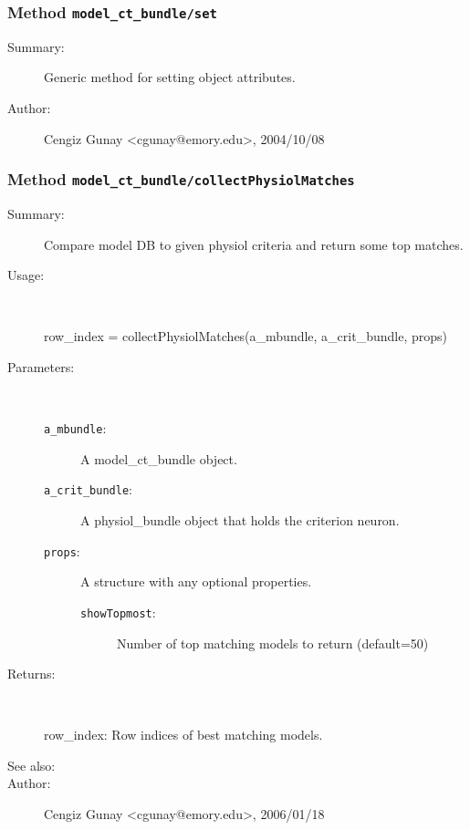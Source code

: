 \subsubsection[Method \texttt{set}]{Method \texttt{model\_ct\_bundle/set}}%
%
\label{ref_model_ct_bundle__set}%
\hypertarget{ref_model_ct_bundle__set}{}%
\begin{description}
\item[Summary:]Generic method for setting object attributes.
%
%
%
%
%
%
%
\item[Author:]%
Cengiz Gunay <cgunay@emory.edu>, 2004/10/08%
\end{description}
\methodline%
\subsubsection[Method \texttt{collectPhysiolMatches}]{Method \texttt{model\_ct\_bundle/collectPhysiolMatches}}%
%
\label{ref_model_ct_bundle__collectPhysiolMatches}%
\hypertarget{ref_model_ct_bundle__collectPhysiolMatches}{}%
\begin{description}
\item[Summary:]Compare model DB to given physiol criteria and return some top matches.
%
\item[Usage:]~%
\begin{lyxcode}%
row\_index = collectPhysiolMatches(a\_mbundle, a\_crit\_bundle, props)
%
\end{lyxcode}%
%
%
\item[Parameters:]~
\begin{description}%
\item[\texttt{a\_mbundle}:]
 A model\_ct\_bundle object.
\item[\texttt{a\_crit\_bundle}:]
 A physiol\_bundle object that holds the criterion neuron.
\item[\texttt{props}:]
 A structure with any optional properties.
\begin{description}%
\item[\texttt{showTopmost}:]
 Number of top matching models to return (default=50)
\end{description}%
\end{description}%
%
\item[Returns: ]~

	row\_index: Row indices of best matching models.
%
%
\item[See also:]%
%
\item[Author:]%
Cengiz Gunay <cgunay@emory.edu>, 2006/01/18%
\end{description}
\methodline%

